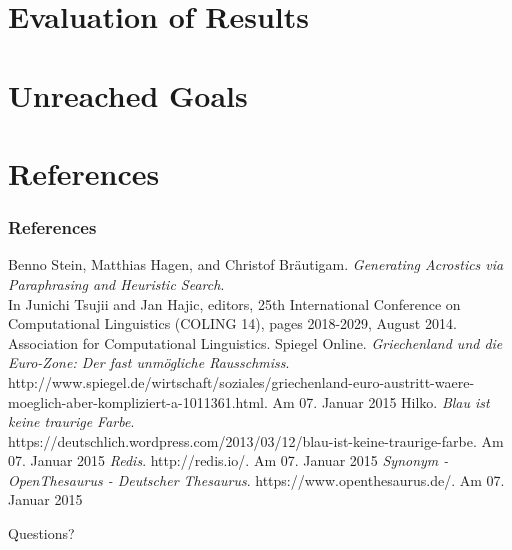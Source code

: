 \documentclass{beamer}
\begin{document}
\section{Evaluation of Results}

\section{Unreached Goals}

\section{References}

\begin{frame}
\frametitle{References}
\scriptsize
\begin{thebibliography}{1}
	Benno Stein, Matthias Hagen, and Christof Bräutigam. \emph{Generating Acrostics via Paraphrasing and Heuristic Search}. \\
	In Junichi Tsujii and Jan Hajic, editors, 25th International Conference on Computational Linguistics (COLING 14), pages 2018-2029, August 2014. Association for Computational Linguistics.
	Spiegel Online. \emph{Griechenland und die Euro-Zone: Der fast unmögliche Rausschmiss}. \\
	http://www.spiegel.de/wirtschaft/soziales/griechenland-euro-austritt-waere-moeglich-aber-kompliziert-a-1011361.html. Am 07. Januar 2015
	Hilko. \emph{Blau ist keine traurige Farbe}. \\
	https://deutschlich.wordpress.com/2013/03/12/blau-ist-keine-traurige-farbe. Am 07. Januar 2015
	\emph{Redis}. http://redis.io/. Am 07. Januar 2015
	\emph{Synonym - OpenThesaurus - Deutscher Thesaurus}. https://www.openthesaurus.de/. Am 07. Januar 2015
\end{thebibliography}
\end{frame}

\begin{frame}
\Huge{\centerline{Questions?}}
\end{frame}

\end{document}
